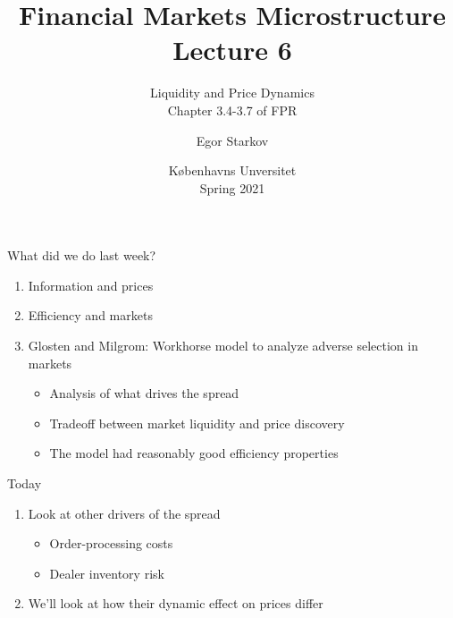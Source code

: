 \documentclass[english,10pt
,aspectratio=169
]{beamer}
\title{Financial Markets Microstructure \\ Lecture 6}
\subtitle{Liquidity and Price Dynamics\\
Chapter 3.4-3.7 of FPR}
\author{Egor Starkov}
\date{K{\o}benhavns Unversitet \\
	Spring 2021}
\begin{document}
	

\frame[plain]{\titlepage}



\begin{frame}{What did we do last week?}
\begin{enumerate}
	\item Information and prices
	\item Efficiency and markets
	\item Glosten and Milgrom: Workhorse model to analyze adverse selection in markets
	\begin{itemize}
	\item Analysis of what drives the spread
	\item Tradeoff between market liquidity and price discovery
	\item The model had reasonably good efficiency properties
	\end{itemize}
\end{enumerate}
\end{frame}




\begin{frame}{Today}
\begin{enumerate}
	\item Look at other drivers of the spread
	\begin{itemize}
		\item Order-processing costs
		\item Dealer inventory risk
	\end{itemize}
	\item We'll look at how their dynamic effect on prices differ
\end{enumerate}
\end{frame}
\end{document}
